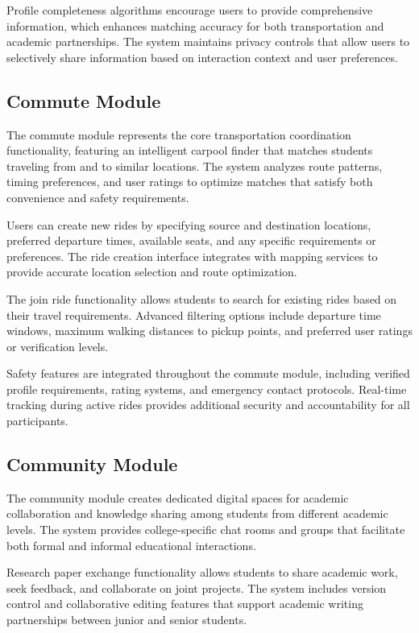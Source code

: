 \documentclass[conference]{IEEEtran}
\begin{document}
Profile completeness algorithms encourage users to provide comprehensive information, which enhances matching accuracy for both transportation and academic partnerships. The system maintains privacy controls that allow users to selectively share information based on interaction context and user preferences.

\subsection{Commute Module}

The commute module represents the core transportation coordination functionality, featuring an intelligent carpool finder that matches students traveling from and to similar locations. The system analyzes route patterns, timing preferences, and user ratings to optimize matches that satisfy both convenience and safety requirements.

Users can create new rides by specifying source and destination locations, preferred departure times, available seats, and any specific requirements or preferences. The ride creation interface integrates with mapping services to provide accurate location selection and route optimization.

The join ride functionality allows students to search for existing rides based on their travel requirements. Advanced filtering options include departure time windows, maximum walking distances to pickup points, and preferred user ratings or verification levels.

Safety features are integrated throughout the commute module, including verified profile requirements, rating systems, and emergency contact protocols. Real-time tracking during active rides provides additional security and accountability for all participants.

\subsection{Community Module}

The community module creates dedicated digital spaces for academic collaboration and knowledge sharing among students from different academic levels. The system provides college-specific chat rooms and groups that facilitate both formal and informal educational interactions.

Research paper exchange functionality allows students to share academic work, seek feedback, and collaborate on joint projects. The system includes version control and collaborative editing features that support academic writing partnerships between junior and senior students.
\end{document}
